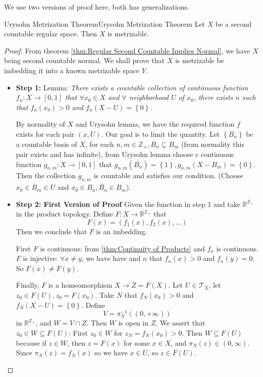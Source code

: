\documentclass[../main.tex]{subfiles}
\begin{document}
We use two versions of proof here, both has generalizations.
\begin{theorem}{Urysohn Metrization Theorem}{Urysohn Metrization Theorem}
	Let $X$ be a second countable regular space. Then $X$ is metrizable.
\end{theorem}
\begin{proof}
	From theorem \ref{thm:Regular Second Countable Implies Normal}, we have $X$ being second countable normal. We shall prove that $X$ is metrizable be imbedding it into a known metrizable space $Y$.
\begin{itemize}
	\item \textbf{Step 1:} Lemma: \emph{There exists a countable collection of continuous function $f_n: X \rightarrow [0,1]$ that $\forall x_0\in X$ and $\forall $ neighborhood $U$ of $x_0$, there exists $n$ such that $f_n(x_0) > 0$ and $f_n(X-U) = \left\{ 0 \right\}$.}

		By normality of $X$ and Urysohn lemma, we have the required function $f$ exists for each pair $(x,U)$. Our goal is to limit the quantity. Let $\left\{ B_n \right\}$ be a countable basis of $X$, for each $n,m\in \mathbb{Z}_+, \overline{B_n} \subseteq B_m$ (from normality this pair exists and has infinite), from Urysohn lemma choose c continuous function $g_{n,m}: X \rightarrow [0,1]$ that $g_{n,m}(\overline{B_n}) = \left\{ 1 \right\},g_{n,m}(X-B_m) = \left\{ 0 \right\}$. Then the collection $g_{n,m}$ is countable and satisfies our condition. (Choose $x_0\in B_m \in U$ and $x_0\in B_n,\overline{B_n}\in B_m$).

	\item \textbf{Step 2: First Version of Proof} Given the function in step 1 and take $\mathbb{R}^{\mathbb{Z}_+}$ in the product topology. Define $F:X \rightarrow \mathbb{R}^{\mathbb{Z}_+}$ that
		\begin{equation}
			F(x) = (f_1(x),f_2(x), \ldots )
		\end{equation}
		Then we conclude that $F$ is an imbedding.

		First $F$ is continuous: from \ref{thm:Continuity of Products} and $f_n$ is continuous. $F$ is injective: $\forall x\neq y$, we have have and $n$ that $f_n(x)>0$ and $f_n(y)=0$. So $F(x)\neq F(y)$.

		Finally, $F$ is a homeomorphism $X \rightarrow Z=F(X)$. Let $U\in \mathcal{T}_X$, let $z_0\in F(U), z_0=F(x_0)$. Take $N$ that $f_N(x_0)>0$ and $f_N(X-U) = \left\{ 0 \right\}$. Define
		\begin{equation*}
			V = \pi_N^{-1}((0,+\infty ))
		\end{equation*}
		in $\mathbb{R}^{\mathbb{Z}_+}$, and $W = V\cap Z$. Then $W$ is open in $Z$. We assert that $z_0\in W \subseteq F(U)$: First $z_0\in W$ for $z_N = f_N(x_0)>0$. Then $W \subseteq F(U)$ because if $z\in W$, then $z=F(x)$ for some $x\in X$, and $\pi_N(z)\in (0,\infty )$. Since $\pi_N(z) = f_N(x)$ so we have $x\in U$, so $z\in F(U)$.


\end{itemize}
\end{proof}
\end{document}
